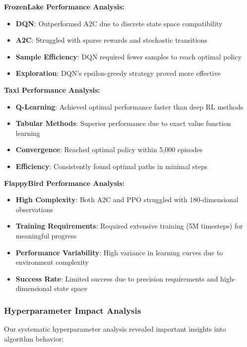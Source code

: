 \documentclass[12pt]{article}
\begin{document}
{{{\textbf{FrozenLake Performance Analysis:}
\begin{itemize}
    \item \textbf{DQN}: Outperformed A2C due to discrete state space compatibility
    \item \textbf{A2C}: Struggled with sparse rewards and stochastic transitions
    \item \textbf{Sample Efficiency}: DQN required fewer samples to reach optimal policy
    \item \textbf{Exploration}: DQN's epsilon-greedy strategy proved more effective
\end{itemize}

\textbf{Taxi Performance Analysis:}
\begin{itemize}
    \item \textbf{Q-Learning}: Achieved optimal performance faster than deep RL methods
    \item \textbf{Tabular Methods}: Superior performance due to exact value function learning
    \item \textbf{Convergence}: Reached optimal policy within 5,000 episodes
    \item \textbf{Efficiency}: Consistently found optimal paths in minimal steps
\end{itemize}

\textbf{FlappyBird Performance Analysis:}
\begin{itemize}
    \item \textbf{High Complexity}: Both A2C and PPO struggled with 180-dimensional observations
    \item \textbf{Training Requirements}: Required extensive training (5M timesteps) for meaningful progress
    \item \textbf{Performance Variability}: High variance in learning curves due to environment complexity
    \item \textbf{Success Rate}: Limited success due to precision requirements and high-dimensional state space
\end{itemize}

\subsubsection{Hyperparameter Impact Analysis}

Our systematic hyperparameter analysis revealed important insights into algorithm behavior:

}}}
\end{document}
